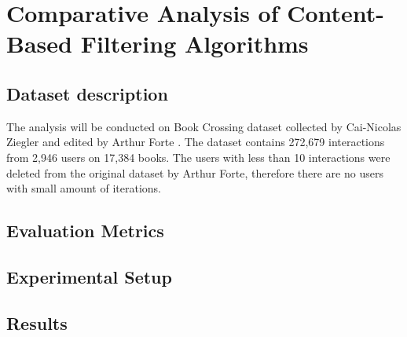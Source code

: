 \section{Comparative Analysis of Content-Based Filtering Algorithms}\label{sec:dataset_analysis}

\subsection{Dataset description} %
The analysis will be conducted on Book Crossing dataset collected by Cai-Nicolas Ziegler and edited by Arthur Forte \cite{Dataset}. The dataset contains 272,679 interactions from 2,946 users on 17,384 books. The users with less than 10 interactions were deleted from the original dataset by Arthur Forte, therefore there are no users with small amount of iterations.

\subsection{Evaluation Metrics} %

\subsection{Experimental Setup} %

\subsection{Results} %